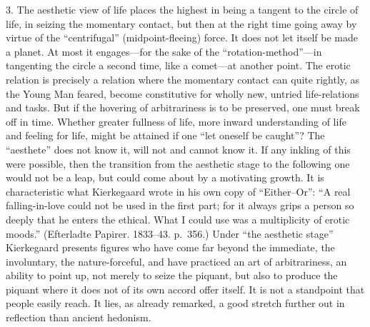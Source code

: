 \documentclass[12pt,a4paper]{book}
\newcommand{\opage}[1]{\marginnote{\footnotesize\textit{[#1]}}}
\begin{document}
3. The aesthetic view of life places the highest in being a tangent to
the circle of life, in seizing the momentary contact, but then at the
right time going away by virtue of the ``centrifugal'' (midpoint-fleeing)
force. It does not let itself be made a planet. At most it engages---for
the sake of the ``rotation-method''---in tangenting the circle a second
time, like a comet---at another point. The erotic relation is precisely a
relation where the momentary contact can quite rightly, as the Young Man
feared, become constitutive for wholly new, untried life-relations and
tasks. But if the hovering of arbitrariness is to be preserved, one must
break off in time. Whether greater fullness of life, more inward
understanding of life and feeling for life, might be attained if one ``let
oneself be caught''? The ``aesthete'' does not know it, will not and
cannot know it. If any inkling of this were possible, then the transition
from the aesthetic stage to the following one would not be a leap, but
could come about by a motivating growth. It is characteristic what
Kierkegaard wrote in his own copy of ``Either--Or'': ``A real
falling-in-love could not be used in the first part; for it always grips a
person so deeply that he enters the ethical. What I could use was a
multiplicity of erotic moods.''
(Efterladte Papirer. 1833--43. p.~356.) Under ``the aesthetic stage''
Kierkegaard presents figures who have come far beyond the immediate, the
involuntary, the nature-forceful, and have practiced an art of
arbitrariness, an ability to point up, not merely to seize the piquant,
but also to produce the piquant where it does not of its own accord
\opage{89}offer itself. It is not a standpoint that people easily reach.
It lies, as already remarked, a good stretch further out in reflection
than ancient hedonism.
\end{document}
